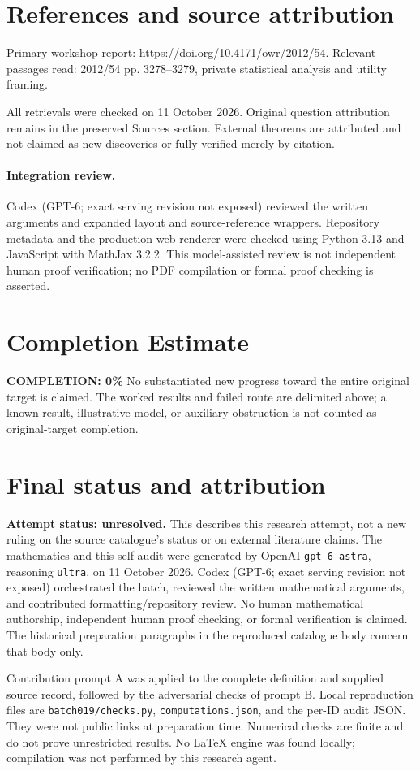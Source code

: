 \documentclass[11pt]{article}
\begin{document}
\section{References and source attribution}
Primary workshop report: \url{https://doi.org/10.4171/owr/2012/54}. Relevant passages read: 2012/54 pp. 3278--3279, private statistical analysis and utility framing.

All retrievals were checked on 11 October 2026. Original question attribution remains in the preserved Sources section. External theorems are attributed and not claimed as new discoveries or fully verified merely by citation.


\paragraph{Integration review.} Codex (GPT-6; exact serving revision not exposed) reviewed the written arguments and expanded layout and source-reference wrappers. Repository metadata and the production web renderer were checked using Python 3.13 and JavaScript with MathJax 3.2.2. This model-assisted review is not independent human proof verification; no PDF compilation or formal proof checking is asserted.

\section{Completion Estimate}
\noindent\textbf{COMPLETION: 0\%}
No substantiated new progress toward the entire original target is claimed. The worked results and failed route are delimited above; a known result, illustrative model, or auxiliary obstruction is not counted as original-target completion.

\section{Final status and attribution}
\textbf{Attempt status: unresolved.} This describes this research attempt, not a new ruling on the source catalogue's status or on external literature claims.
The mathematics and this self-audit were generated by OpenAI \texttt{gpt-6-astra}, reasoning \texttt{ultra}, on 11 October 2026. Codex (GPT-6; exact serving revision not exposed) orchestrated the batch, reviewed the written mathematical arguments, and contributed formatting/repository review. No human mathematical authorship, independent human proof checking, or formal verification is claimed. The historical preparation paragraphs in the reproduced catalogue body concern that body only.

Contribution prompt A was applied to the complete definition and supplied source record, followed by the adversarial checks of prompt B. Local reproduction files are \texttt{batch019/checks.py}, \texttt{computations.json}, and the per-ID audit JSON. They were not public links at preparation time. Numerical checks are finite and do not prove unrestricted results. No LaTeX engine was found locally; compilation was not performed by this research agent.
\end{document}
